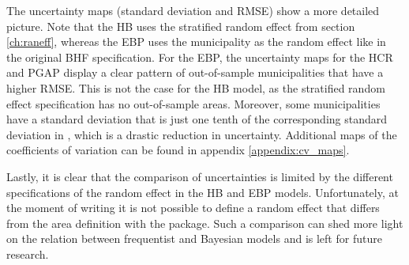 The uncertainty maps (standard deviation and RMSE) show a more detailed picture.
Note that the HB uses the stratified random effect from section \ref{ch:raneff}, whereas the EBP uses the municipality as the random effect like in the original BHF specification.
For the EBP, the uncertainty maps for the HCR and PGAP display a clear pattern of out-of-sample municipalities that have a higher RMSE.
This is not the case for the HB model, as the stratified random effect specification has no out-of-sample areas.
Moreover, some municipalities have a standard deviation that is just one tenth of the corresponding standard deviation in \citep{morelli_hierarchical_2021}, which is a drastic reduction in uncertainty.
Additional maps of the coefficients of variation can be found in appendix \ref{appendix:cv_maps}.

Lastly, it is clear that the comparison of uncertainties is limited by the different specifications of the random effect in the HB and EBP models.
Unfortunately, at the moment of writing it is not possible to define a random effect that differs from the area definition with the  package.
Such a comparison can shed more light on the relation between frequentist and Bayesian models and is left for future research.

